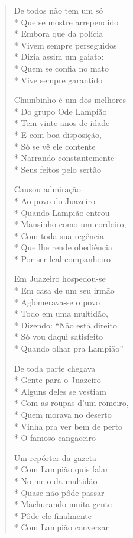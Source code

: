 \begin{verse}
De todos não tem um só\\*
Que se mostre arrependido\\*
Embora que da polícia\\*
Vivem sempre perseguidos\\*
Dizia assim um gaiato:\\*
Quem se confia no mato\\*
Vive sempre garantido

Chumbinho é um dos melhores\\*
Do grupo Ode Lampião\\*
Tem vinte anos de idade\\*
E com boa disposição,\\*
Só se vê ele contente\\*
Narrando constantemente\\*
Seus feitos pelo sertão

Causou admiração\\*
Ao povo do Juazeiro\\*
Quando Lampião entrou\\*
Mansinho como um cordeiro,\\*
Com toda sua regência\\*
Que lhe rende obediência\\*
Por ser leal companheiro

Em Juazeiro hospedou-se\\*
Em casa de um seu irmão\\*
Aglomerava-se o povo\\*
Todo em uma multidão,\\*
Dizendo: ``Não está direito\\*
Só vou daqui satisfeito\\*
Quando olhar pra Lampião''

De toda parte chegava\\*
Gente para o Juazeiro\\*
Alguns deles se vestiam\\*
Com as roupas d'um romeiro,\\*
Quem morava no deserto\\*
Vinha pra ver bem de perto\\*
O famoso cangaceiro

Um repórter da gazeta\\*
Com Lampião quis falar\\*
No meio da multidão\\*
Quase não pôde passar\\*
Machucando muita gente\\*
Pôde ele finalmente\\*
Com Lampião conversar


\end{verse}
